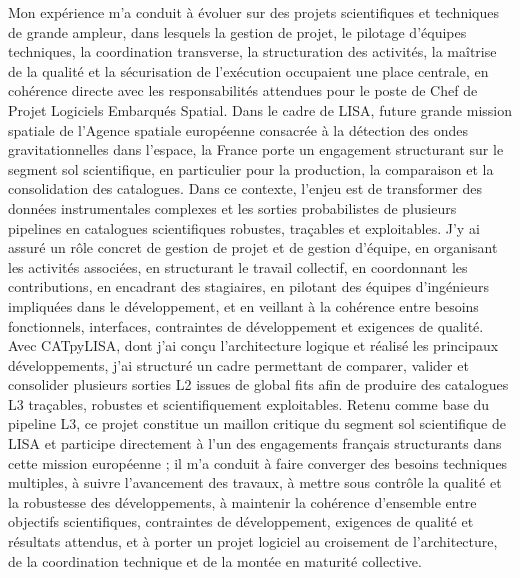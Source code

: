 \documentclass[11pt,a4paper]{../_shared/altacv}
\begin{document}
{Mon expérience m'a conduit à évoluer sur des projets scientifiques et techniques de grande ampleur, dans lesquels la gestion de projet, le pilotage d'équipes techniques, la coordination transverse, la structuration des activités, la maîtrise de la qualité et la sécurisation de l'exécution occupaient une place centrale, en cohérence directe avec les responsabilités attendues pour le poste de Chef de Projet Logiciels Embarqués Spatial. Dans le cadre de LISA, future grande mission spatiale de l'Agence spatiale européenne consacrée à la détection des ondes gravitationnelles dans l'espace, la France porte un engagement structurant sur le segment sol scientifique, en particulier pour la production, la comparaison et la consolidation des catalogues. Dans ce contexte, l'enjeu est de transformer des données instrumentales complexes et les sorties probabilistes de plusieurs pipelines en catalogues scientifiques robustes, traçables et exploitables. J'y ai assuré un rôle concret de gestion de projet et de gestion d'équipe, en organisant les activités associées, en structurant le travail collectif, en coordonnant les contributions, en encadrant des stagiaires, en pilotant des équipes d'ingénieurs impliquées dans le développement, et en veillant à la cohérence entre besoins fonctionnels, interfaces, contraintes de développement et exigences de qualité. Avec CATpyLISA, dont j'ai conçu l'architecture logique et réalisé les principaux développements, j'ai structuré un cadre permettant de comparer, valider et consolider plusieurs sorties L2 issues de global fits afin de produire des catalogues L3 traçables, robustes et scientifiquement exploitables. Retenu comme base du pipeline L3, ce projet constitue un maillon critique du segment sol scientifique de LISA et participe directement à l'un des engagements français structurants dans cette mission européenne ; il m'a conduit à faire converger des besoins techniques multiples, à suivre l'avancement des travaux, à mettre sous contrôle la qualité et la robustesse des développements, à maintenir la cohérence d'ensemble entre objectifs scientifiques, contraintes de développement, exigences de qualité et résultats attendus, et à porter un projet logiciel au croisement de l'architecture, de la coordination technique et de la montée en maturité collective.

}
\end{document}
